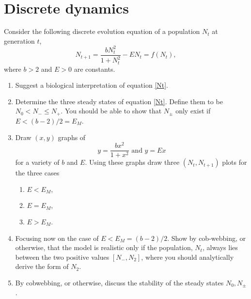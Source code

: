\documentclass[10pt]{article}
\newcommand{\bb}{\begin{equation}}
\newcommand{\ee}{\end{equation}}
\newcommand{\eqn}[1]{equation \eqref{#1}}
\begin{document}
\section{Discrete dynamics}
Consider the following discrete evolution equation of a population $N_t$ at generation $t$,
\bb
N_{t+1}=\frac{bN_t^2}{1+N_t^2}-EN_t=f(N_t),\label{Nt}
\ee
where $b>2$ and $E>0$ are constants.
\begin{enumerate}
\item Suggest a biological interpretation of \eqn{Nt}.
\item Determine the three steady states of \eqn{Nt}. Define them to be $N_0<N_-\leq N_+$. You should be able to show that $N_\pm$ only exist if $E<(b-2)/2=E_M$.
\item Draw $(x,y)$ graphs of
\bb
y=\frac{bx^2}{1+x^2} \text{ and }y=Ex\label{Components}
\ee
for a variety of $b$ and $E$. Using these graphs draw three $(N_t,N_{t+1})$ plots for the three cases
\begin{enumerate}
\item $E<E_M$,
\item $E=E_M$,
\item $E>E_M$.
\end{enumerate}
\item Focusing now on the case of $E<E_M=(b-2)/2$. Show by cob-webbing, or otherwise, that the model is realistic only if the population, $N_t$, always lies between the two positive values $[N_-,N_2]$, where you should analytically derive the form of $N_2$.
\item By cobwebbing, or otherwise, discuss the stability of the steady states $N_0, N_\pm$.
\end{enumerate}
\end{document}
